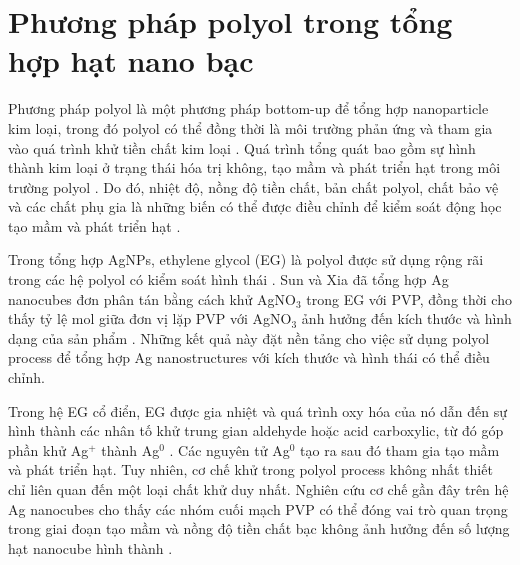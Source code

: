 \section{Phương pháp polyol trong tổng hợp hạt nano bạc}
Phương pháp polyol là một phương pháp bottom-up để tổng hợp nanoparticle kim loại, trong đó polyol có thể đồng thời là môi trường phản ứng và tham gia vào quá trình khử tiền chất kim loại \parencite{ammar2020,wolf2022}.
Quá trình tổng quát bao gồm sự hình thành kim loại ở trạng thái hóa trị không, tạo mầm và phát triển hạt trong môi trường polyol \parencite{ammar2020,jun2022}.
Do đó, nhiệt độ, nồng độ tiền chất, bản chất polyol, chất bảo vệ và các chất phụ gia là những biến có thể được điều chỉnh để kiểm soát động học tạo mầm và phát triển hạt \parencite{ammar2020,wolf2022}.
\par
Trong tổng hợp AgNPs, ethylene glycol (EG) là polyol được sử dụng rộng rãi trong các hệ polyol có kiểm soát hình thái \parencite{sunxia2002,wolf2022}.
Sun và Xia đã tổng hợp Ag nanocubes đơn phân tán bằng cách khử AgNO$_3$ trong EG với PVP, đồng thời cho thấy tỷ lệ mol giữa đơn vị lặp PVP với AgNO$_3$ ảnh hưởng đến kích thước và hình dạng của sản phẩm \parencite{sunxia2002}.
Những kết quả này đặt nền tảng cho việc sử dụng polyol process để tổng hợp Ag nanostructures với kích thước và hình thái có thể điều chỉnh.
\par
Trong hệ EG cổ điển, EG được gia nhiệt và quá trình oxy hóa của nó dẫn đến sự hình thành các nhân tố khử trung gian aldehyde hoặc acid carboxylic, từ đó góp phần khử Ag$^+$ thành Ag$^0$ \parencite{wolf2022}.
Các nguyên tử Ag$^0$ tạo ra sau đó tham gia tạo mầm và phát triển hạt.
Tuy nhiên, cơ chế khử trong polyol process không nhất thiết chỉ liên quan đến một loại chất khử duy nhất.
Nghiên cứu cơ chế gần đây trên hệ Ag nanocubes cho thấy các nhóm cuối mạch PVP có thể đóng vai trò quan trọng trong giai đoạn tạo mầm và nồng độ tiền chất bạc không ảnh hưởng đến số lượng hạt nanocube hình thành \parencite{canning2025}.
\par
